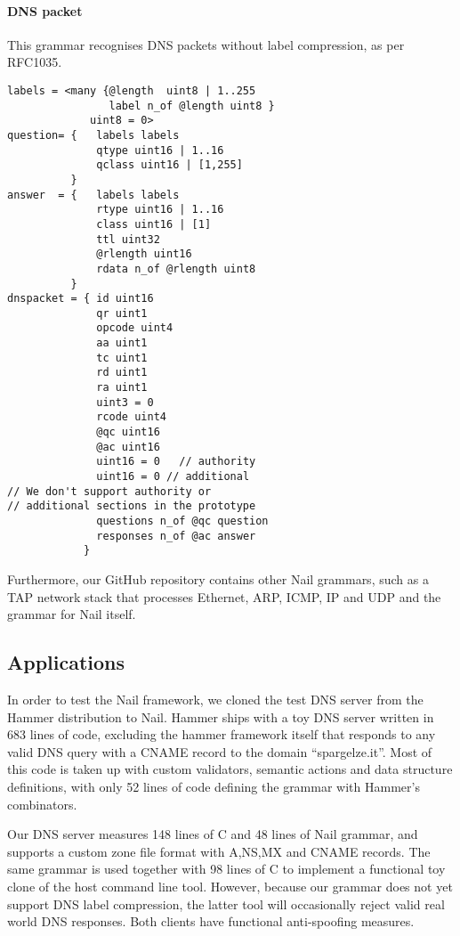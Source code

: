 \paragraph{DNS packet}
This grammar recognises DNS packets without label compression, as per RFC1035.
\begin{verbatim}
labels = <many {@length  uint8 | 1..255 
                label n_of @length uint8 }
             uint8 = 0>
question= {   labels labels
              qtype uint16 | 1..16 
              qclass uint16 | [1,255]
          }
answer  = {   labels labels
              rtype uint16 | 1..16
              class uint16 | [1]
              ttl uint32
              @rlength uint16 
              rdata n_of @rlength uint8 
          }
dnspacket = { id uint16
              qr uint1
              opcode uint4
              aa uint1 
              tc uint1
              rd uint1
              ra uint1
              uint3 = 0
              rcode uint4
              @qc uint16
              @ac uint16
              uint16 = 0   // authority 
              uint16 = 0 // additional
// We don't support authority or 
// additional sections in the prototype
              questions n_of @qc question         
              responses n_of @ac answer
            }
\end{verbatim}
  
Furthermore, our GitHub
repository contains other Nail grammars, such as a TAP network stack that processes Ethernet, ARP,
ICMP, IP and UDP and the grammar for Nail itself. 

\subsection{Applications}

In order to test the Nail framework, we cloned the test DNS server from the Hammer distribution to
Nail. Hammer ships with a toy DNS server written in 683 lines of code, excluding the hammer
framework itself that responds to any valid DNS query with a CNAME record to the domain
``spargelze.it''.  Most of this code is taken up with custom validators, semantic actions and data
structure definitions, with only 52 lines of code defining the grammar with Hammer's combinators.

Our DNS server measures 148 lines of C and 48 lines of Nail grammar, and supports a custom zone file format
with A,NS,MX and CNAME records. The same grammar is used together with 98 lines of C to implement a
functional toy clone of the host command line tool. However, because our grammar does not yet
support DNS label compression, the latter tool will occasionally reject valid real world DNS
responses. Both clients have functional anti-spoofing measures.

